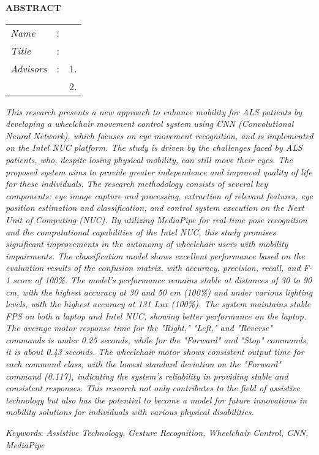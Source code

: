 \begin{center}
  \large\textbf{ABSTRACT}
\end{center}


\vspace{2ex}

\begingroup
\setlength{\tabcolsep}{0pt}

\noindent
\begin{tabularx}{\textwidth}{l >{\centering}m{3em} X}
  \emph{Name}     & : & \name{}         \\

  \emph{Title}    & : & \engtatitle{}   \\

  \emph{Advisors} & : & 1. \advisor{}   \\
                  &   & 2. \coadvisor{} \\
\end{tabularx}
\endgroup

\emph{This research presents a new approach to enhance mobility for ALS patients by developing a wheelchair movement control system using CNN (Convolutional Neural Network), which focuses on eye movement recognition, and is implemented on the Intel NUC platform. The study is driven by the challenges faced by ALS patients, who, despite losing physical mobility, can still move their eyes. The proposed system aims to provide greater independence and improved quality of life for these individuals. The research methodology consists of several key components: eye image capture and processing, extraction of relevant features, eye position estimation and classification, and control system execution on the Next Unit of Computing (NUC). By utilizing MediaPipe for real-time pose recognition and the computational capabilities of the Intel NUC, this study promises significant improvements in the autonomy of wheelchair users with mobility impairments. The classification model shows excellent performance based on the evaluation results of the confusion matrix, with accuracy, precision, recall, and F-1 score of 100\%. The model's performance remains stable at distances of 30 to 90 cm, with the highest accuracy at 30 and 50 cm (100\%) and under various lighting levels, with the highest accuracy at 131 Lux (100\%). The system maintains stable FPS on both a laptop and Intel NUC, showing better performance on the laptop. The average motor response time for the "Right," "Left," and "Reverse" commands is under 0.25 seconds, while for the "Forward" and "Stop" commands, it is about 0.43 seconds. The wheelchair motor shows consistent output time for each command class, with the lowest standard deviation on the "Forward" command (0.117), indicating the system's reliability in providing stable and consistent responses. This research not only contributes to the field of assistive technology but also has the potential to become a model for future innovations in mobility solutions for individuals with various physical disabilities.}

\emph{Keywords}: \emph{Assistive Technology, Gesture Recognition, Wheelchair Control, CNN, MediaPipe}